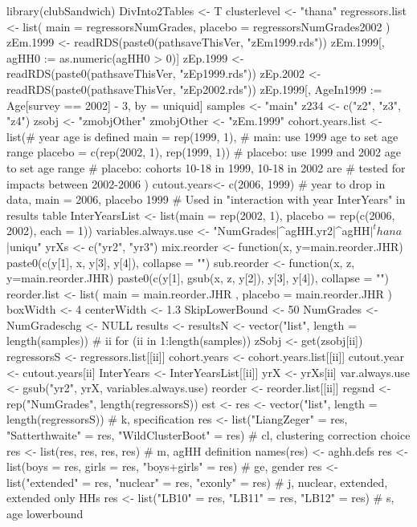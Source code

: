 \begin{Schunk}
\begin{Sinput}
library(clubSandwich)
DivInto2Tables <- T
clusterlevel <- "thana"
regressors.list <- list(
  main = regressorsNumGrades,
  placebo = regressorsNumGrades2002
)
zEm.1999 <- readRDS(paste0(pathsaveThisVer, "zEm1999.rds"))
zEm.1999[, agHH0 :=  as.numeric(agHH0 > 0)]
zEp.1999 <- readRDS(paste0(pathsaveThisVer, "zEp1999.rds"))
zEp.2002 <- readRDS(paste0(pathsaveThisVer, "zEp2002.rds"))
zEp.1999[, AgeIn1999 := Age[survey == 2002] - 3, by = uniquid]
samples <- "main"
z234 <- c("z2", "z3", "z4")
zsobj <- "zmobjOther"
zmobjOther <- "zEm.1999"
cohort.years.list <- list(# year age is defined
  main = rep(1999, 1), # main: use 1999 age to set age range
  placebo = c(rep(2002, 1), rep(1999, 1))
  # placebo: use 1999 and 2002 age to set age range
  # placebo: cohorts 10-18 in 1999, 10-18 in 2002 are 
  #   tested for impacts between 2002-2006
  )
cutout.years<- c(2006, 1999) # year to drop in data, main = 2006, placebo 1999
# Used in "interaction with year InterYears" in results table
InterYearsList <- list(main = rep(2002, 1), placebo = rep(c(2006, 2002), each = 1))
variables.always.use <- "NumGrades|^agHH.yr2|^agHH$|^thana$|uniqu"
yrXs <- c("yr2", "yr3")
mix.reorder <- function(x, y=main.reorder.JHR) 
  paste0(c(y[1], x, y[3], y[4]), collapse = "")
sub.reorder <- function(x, z, y=main.reorder.JHR) 
  paste0(c(y[1], gsub(x, z, y[2]), y[3], y[4]), collapse = "")
reorder.list <- list(
    main = main.reorder.JHR
  , placebo = main.reorder.JHR
)
boxWidth <- 4
centerWidth <- 1.3
SkipLowerBound <- 50
NumGrades <- NumGradeschg <- NULL
results <- resultsN <- vector("list", length = length(samples)) # ii
for (ii in 1:length(samples)) {
  zSobj <- get(zsobj[ii])
  regressorsS <-  regressors.list[[ii]]
  cohort.years <- cohort.years.list[[ii]]
  cutout.year <- cutout.years[ii]
  InterYears <- InterYearsList[[ii]]
  yrX <- yrXs[ii]
  var.always.use <- gsub("yr2", yrX, variables.always.use)
  reorder <- reorder.list[[ii]]
  regsnd <- rep("NumGrades", length(regressorsS))
  est <- res <- vector("list", length = length(regressorsS)) # k, specification
  res <- list("LiangZeger" = res, "Satterthwaite" = res, "WildClusterBoot" = res) # cl, clustering correction choice
  res <- list(res, res, res, res) # m, agHH definition
  names(res) <- aghh.defs
  res <- list(boys = res, girls = res, "boys+girls" = res) # ge, gender
  res <- list("extended" = res, "nuclear" = res, "exonly" = res) # j, nuclear, extended, extended only HHs
  res <- list("LB10" = res, "LB11" = res, "LB12" = res) # s, age lowerbound
}
\end{Sinput}
\end{Schunk}

